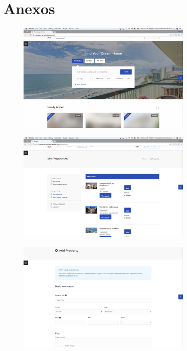 \documentclass[12pt]{article}
\begin{document}
\section{Anexos}

\begin{figure}[H]
\centering
\includegraphics[width=0.75\textwidth]{img1.jpg}
\caption{}
\end{figure} 

\begin{figure}[H]
\centering
\includegraphics[width=0.75\textwidth]{img2.png}
\caption{}
\end{figure} 

\begin{figure}[H]
\centering
\includegraphics[width=0.75\textwidth]{img3.png}
\caption{}
\end{figure} 
\end{document}

